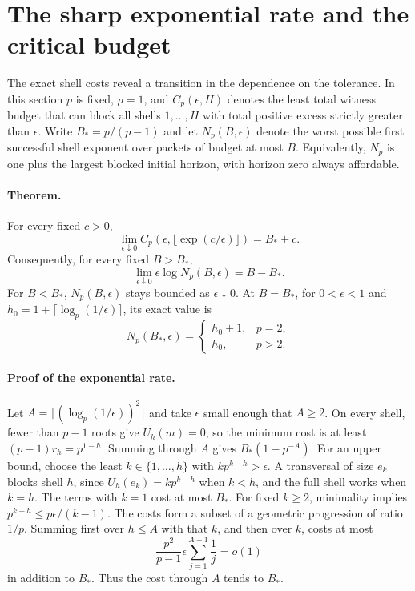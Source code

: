 \section{The sharp exponential rate and the critical budget}

The exact shell costs reveal a transition in the dependence on the tolerance. In this section $p$ is fixed, $\rho=1$, and $C_p(\epsilon,H)$ denotes the least total witness budget that can block all shells $1,\ldots,H$ with total positive excess strictly greater than $\epsilon$. Write $B_*=p/(p-1)$ and let $N_p(B,\epsilon)$ denote the worst possible first successful shell exponent over packets of budget at most $B$. Equivalently, $N_p$ is one plus the largest blocked initial horizon, with horizon zero always affordable.

\paragraph{Theorem.}
For every fixed $c>0$,
\[
 \lim_{\epsilon\downarrow0} C_p\!\left(\epsilon,\lfloor\exp(c/\epsilon)\rfloor\right)=B_*+c.
\]
Consequently, for every fixed $B>B_*$,
\[
 \boxed{\displaystyle\lim_{\epsilon\downarrow0}\epsilon\log N_p(B,\epsilon)=B-B_*.}
\]
For $B<B_*$, $N_p(B,\epsilon)$ stays bounded as $\epsilon\downarrow0$. At $B=B_*$, for $0<\epsilon<1$ and $h_0=1+\lceil\log_p(1/\epsilon)\rceil$, its exact value is
\[
 N_p(B_*,\epsilon)=
 \begin{cases} h_0+1,&p=2,\\ h_0,&p>2.\end{cases}
\]

\paragraph{Proof of the exponential rate.}
Let $A=\lceil(\log_p(1/\epsilon))^2\rceil$ and take $\epsilon$ small enough that $A\ge2$. On every shell, fewer than $p-1$ roots give $U_h(m)=0$, so the minimum cost is at least $(p-1)r_h=p^{1-h}$. Summing through $A$ gives $B_*(1-p^{-A})$. For an upper bound, choose the least $k\in\{1,\ldots,h\}$ with $k p^{k-h}>\epsilon$. A transversal of size $e_k$ blocks shell $h$, since $U_h(e_k)=k p^{k-h}$ when $k<h$, and the full shell works when $k=h$. The terms with $k=1$ cost at most $B_*$. For fixed $k\ge2$, minimality implies $p^{k-h}\le p\epsilon/(k-1)$. The costs form a subset of a geometric progression of ratio $1/p$. Summing first over $h\le A$ with that $k$, and then over $k$, costs at most
\[
 \frac{p^2}{p-1}\epsilon\sum_{j=1}^{A-1}\frac1j=o(1)
\]
in addition to $B_*$. Thus the cost through $A$ tends to $B_*$.

